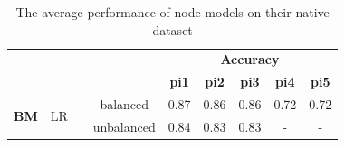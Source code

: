 \documentclass{mpaper}
\begin{document}
\begin{table}[]
\begin{tabular}{|cccc|ccccc|}
                                                        &                                                          &                                                           &                                              & \multicolumn{5}{c|}{\textbf{Accuracy}}                                                            \\ \cline{5-9} 
                                                        &                                                          &                                                           &                                              & \textbf{pi1}                         & \textbf{pi2}  & \textbf{pi3} & \textbf{pi4} & \textbf{pi5} \\ \hline
\multicolumn{1}{|c|}{\multirow{2}{*}{\textbf{BM}}}      & \multicolumn{1}{c|}{\multirow{2}{*}{LR}}                 & \multicolumn{1}{c|}{}                                     & balanced                                     & 0.87                                 & 0.86          & 0.86         & 0.72         & 0.72         \\ \cline{4-9} 
\multicolumn{1}{|c|}{}                                  & \multicolumn{1}{c|}{}                                    & \multicolumn{1}{c|}{}                                     & unbalanced                                   & 0.84                                 & 0.83          & 0.83         & -            & -            \\ \hline
\end{tabular}
\caption{\label{tab:node_performance}The average performance of node models on their native dataset}
\end{table}
\end{document}
